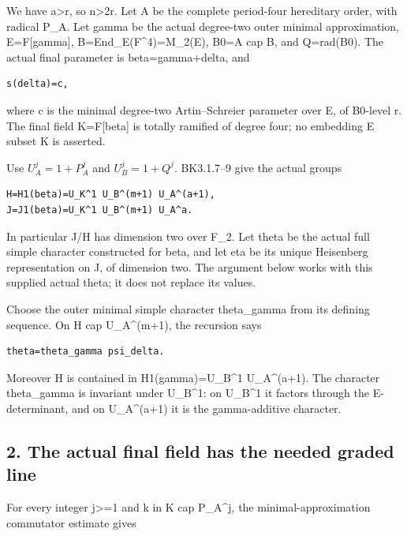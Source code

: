 We have a\textgreater r, so n\textgreater2r. Let A be the complete
period-four hereditary order, with radical P\_A. Let gamma be the actual
degree-two outer minimal approximation, E=F{[}gamma{]},
B=End\_E(F\^{}4)=M\_2(E), B0=A cap B, and Q=rad(B0). The actual final
parameter is beta=gamma+delta, and

\begin{Verbatim}[fontsize=\small,breaklines=true,breakanywhere=true]
s(delta)=c,
\end{Verbatim}

where c is the minimal degree-two Artin--Schreier parameter over E, of
B0-level r. The final field K=F{[}beta{]} is totally ramified of degree
four; no embedding E subset K is asserted.

Use \(U_A^j=1+P_A^j\) and \(U_B^j=1+Q^j\).
BK3.1.7--9 give the actual groups

\begin{Verbatim}[fontsize=\small,breaklines=true,breakanywhere=true]
H=H1(beta)=U_K^1 U_B^(m+1) U_A^(a+1),
J=J1(beta)=U_K^1 U_B^(m+1) U_A^a.
\end{Verbatim}

In particular J/H has dimension two over F\_2. Let theta be the actual
full simple character constructed for beta, and let eta be its unique
Heisenberg representation on J, of dimension two. The argument below
works with this supplied actual theta; it does not replace its values.

Choose the outer minimal simple character theta\_gamma from its defining
sequence. On H cap U\_A\^{}(m+1), the recursion says

\begin{Verbatim}[fontsize=\small,breaklines=true,breakanywhere=true]
theta=theta_gamma psi_delta.
\end{Verbatim}

Moreover H is contained in H1(gamma)=U\_B\^{}1 U\_A\^{}(a+1). The
character theta\_gamma is invariant under U\_B\^{}1: on U\_B\^{}1 it
factors through the E-determinant, and on U\_A\^{}(a+1) it is the
gamma-additive character.

\hypertarget{rank4-the-actual-final-field-has-the-needed-graded-line}{%
\subsection{2. The actual final field has the needed graded
line}\label{rank4-the-actual-final-field-has-the-needed-graded-line}}

For every integer j\textgreater=1 and k in K cap P\_A\^{}j, the
minimal-approximation commutator estimate gives


